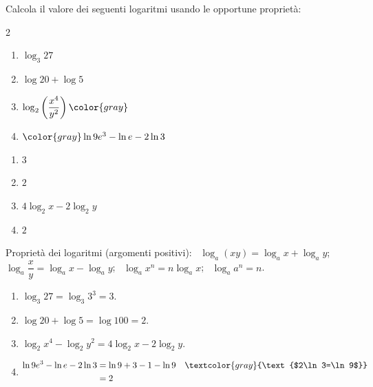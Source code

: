 
\begin{question}[ID=1.2, subtitle={Calcolo di logaritmi con le proprietà (variante)}, difficulty=facile, tags={logaritmi, proprietà}]
Calcola il valore dei seguenti logaritmi usando le opportune proprietà:
\begin{center}\begin{minipage}{0.92\linewidth}
\begin{multicols}{2}
\begin{enumerate}[leftmargin=3.2cm]
\item $\log_3 27$
\item $\log 20 + \log 5$
\item $\log_2 \left(\dfrac{x^4}{y^2}\right) \color{gray}$
\item $\color{gray}\ln 9e^3 - \ln e - 2\ln 3$
\end{enumerate}
\end{multicols}
\end{minipage}\end{center}
\begin{solution}
\begin{enumerate}
    \item $3$
    \item $2$
    \item $4\log_2x-2\log_2y$
    \item $2$
\end{enumerate}
\end{solution}
\begin{explanation}
Proprietà dei logaritmi (argomenti positivi): \ $\log_a(xy)=\log_ax+\log_ay$; \ $\log_a\dfrac xy=\log_ax-\log_ay$; \ $\log_a x^n=n\log_ax$; \ $\log_a a^n=n$.
\begin{enumerate}
    \item $\log_3 27=\log_3 3^3=3$.
    \item $\log20+\log5=\log100=2$.
    \item $\log_2x^4-\log_2y^2=4\log_2x-2\log_2y$.
    \item \[\begin{aligned}
    \ln9e^3-\ln e-2\ln3 &= \ln9+3-1-\ln9 && \textcolor{gray}{\text{$2\ln3=\ln9$}}\\
    &= 2
    \end{aligned}\]
\end{enumerate}
\end{explanation}
\end{question}



